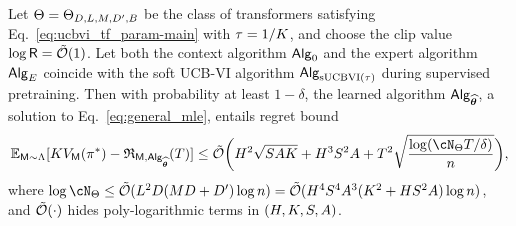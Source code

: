 \begin{theorem}\label{thm:ucbvi_icrl-main}
Let $\Theta = \Theta_{D, L, M, {D'}, B}$ be the class of transformers satisfying Eq.~\eqref{eq:ucbvi_tf_param-main} with ${\tau} = 1/{K}$, and choose the clip value $\log {\mathsf{R}} = {\tilde{\mathcal O}}(1)$. Let both the context algorithm ${\mathsf{Alg}}_0$ and the expert algorithm ${\mathsf{Alg}}_{E}$ coincide with the soft UCB-VI algorithm ${\mathsf{Alg}}_{{\mathrm{sUCBVI}}(\tau)}$ during supervised pretraining.  Then with probability at least $1-\delta$, the learned algorithm ${\mathsf{Alg}}_{{\widehat{{\boldsymbol \theta}}}}$, a solution to Eq.~\eqref{eq:general_mle}, entails regret bound
\begin{align*}
\E_{\inst\sim\prior}[\Numepi\Vfun_\inst(\plc^*)-\totreward_{\inst,\sAlg_\esttfpar}(\totlen)]\leq \tcO \bigg(\horizon^2\sqrt{\Numst\Numact\Numepi}+\horizon^3\Numst^2\Numact+\totlen^2\sqrt{\frac{\log ( \cN_{\Parspace} \totlen/\delta ) }{n} } \bigg),
\end{align*}
where $\log \cN_{\Parspace} \le \tcO(\layer^2\embd(\head\embd+\hidden) \log\Numobs) = \tcO(\horizon^4\Numst^4\Numact^3(\Numepi^2+\horizon\Numst^2\Numact)\log\Numobs)$, and ${\tilde{\mathcal O}}(\cdot)$ hides poly-logarithmic terms in $({H},{K},{S},{A})$.
\end{theorem}

